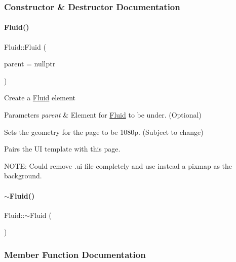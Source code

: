 \subsubsection{Constructor \& Destructor Documentation}
\mbox{\label{classFluid_af73b49dddf652b62f3cb78e400c09446}} 
\paragraph{\texorpdfstring{Fluid()}{Fluid()}}
{\footnotesize\ttfamily Fluid\+::\+Fluid (\begin{DoxyParamCaption}\item[{Q\+Widget $\ast$}]{parent = {\ttfamily nullptr} }\end{DoxyParamCaption})\hspace{0.3cm}{\ttfamily [explicit]}}

Create a \mbox{\hyperlink{classFluid}{Fluid}} element 
\begin{DoxyParams}{Parameters}
{\em parent} & Element for \mbox{\hyperlink{classFluid}{Fluid}} to be under. (Optional)\\
\hline
\end{DoxyParams}
Sets the geometry for the page to be 1080p. (Subject to change)

Pairs the UI template with this page.

N\+O\+TE\+: Could remove .ui file completely and use instead a pixmap as the background. \mbox{\label{classFluid_af461f45faf49d13c195739a57ab7814a}} 
\paragraph{\texorpdfstring{$\sim$Fluid()}{~Fluid()}}
{\footnotesize\ttfamily Fluid\+::$\sim$\+Fluid (\begin{DoxyParamCaption}{ }\end{DoxyParamCaption})}



\subsubsection{Member Function Documentation}
\mbox{\label{classFluid_a92695db4868e8b2ec1bf4649ce5a9d19}} 
